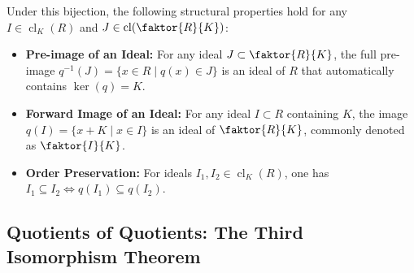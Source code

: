 \begin{content}

\begin{steps}
Under this bijection, the following structural properties hold for any $I \in \operatorname{cl}_K(R)$ and $J \in \operatorname{cl}(\faktor{R}{K})$:
\begin{itemize}
    \item \textbf{Pre-image of an Ideal:} For any ideal $J \subset \faktor{R}{K}$, the full pre-image $q^{-1}(J) = \{ x \in R \mid q(x) \in J \}$ is an ideal of $R$ that automatically contains $\ker(q) = K$.
    \item \textbf{Forward Image of an Ideal:} For any ideal $I \subset R$ containing $K$, the image $q(I) = \{ x + K \mid x \in I \}$ is an ideal of $\faktor{R}{K}$, commonly denoted as $\faktor{I}{K}$.
    \item \textbf{Order Preservation:} For ideals $I_1, I_2 \in \operatorname{cl}_K(R)$, one has $I_1 \subseteq I_2 \iff q(I_1) \subseteq q(I_2)$.
\end{itemize}
\end{steps}
\end{content}

\subsection{Quotients of Quotients: The Third Isomorphism Theorem}

